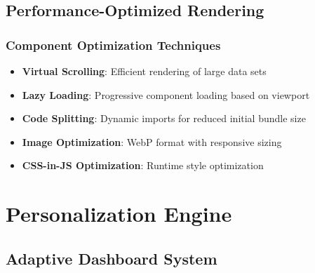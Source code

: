 \subsection{Performance-Optimized Rendering}

\subsubsection{Component Optimization Techniques}

\begin{itemize}
    \item \textbf{Virtual Scrolling}: Efficient rendering of large data sets
    \item \textbf{Lazy Loading}: Progressive component loading based on viewport
    \item \textbf{Code Splitting}: Dynamic imports for reduced initial bundle size
    \item \textbf{Image Optimization}: WebP format with responsive sizing
    \item \textbf{CSS-in-JS Optimization}: Runtime style optimization
\end{itemize}

\section{Personalization Engine}

\subsection{Adaptive Dashboard System}

